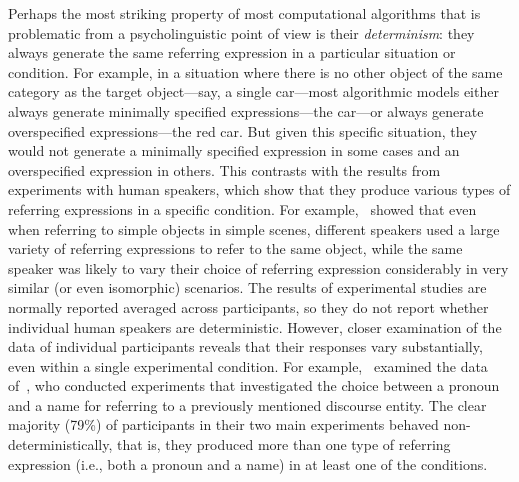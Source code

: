 Perhaps the most striking property of most computational algorithms that is problematic from a psycholinguistic point of view is their \emph{determinism}: they always generate the same referring expression in a particular situation or condition. For example, in a situation where there is no other object of the same category as the target object---say, a single car---most algorithmic models either always generate minimally specified expressions---the car---or always generate overspecified expressions---the red car. But given this specific situation, they would not generate a minimally specified expression in some cases and an overspecified expression in others. This contrasts with the results from experiments with human speakers, which show that they produce various types of referring expressions in a specific condition. For example,~\cite{dale10} showed that even when referring to simple objects in simple scenes, different speakers used a large variety of referring expressions to refer to the same object, while the same speaker was likely to vary their choice of referring expression considerably in very similar (or even isomorphic) scenarios. The results of experimental studies are normally reported averaged across participants, so they do not report whether individual human speakers are deterministic. However, closer examination of the data of individual participants reveals that their responses vary substantially, even within a single experimental condition. For example,~\cite{deemter12} examined the data of~\cite{Fukumura10}, who conducted experiments that investigated the choice between a pronoun and a name for referring to a previously mentioned discourse entity. The clear majority (79\%) of participants in their two main experiments behaved non-deterministically, that is, they produced more than one type of referring expression (i.e., both a pronoun and a name) in at least one of the conditions.

